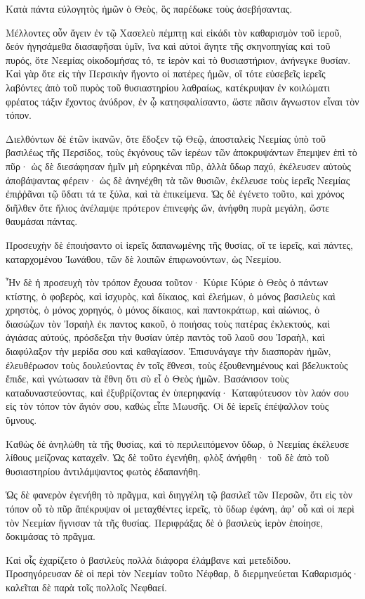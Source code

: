 {\par }{\PP {}Κατὰ πάντα εὐλογητὸς ἡμῶν ὁ Θεὸς, ὃς παρέδωκε τοὺς ἀσεβήσαντας.
\par }{\PP {}Μέλλοντες οὖν ἄγειν ἐν τῷ Χασελεὺ πέμπτῃ καὶ εἰκάδι τὸν καθαρισμὸν τοῦ ἱεροῦ, δεόν ἡγησάμεθα διασαφῆσαι ὑμῖν, ἵνα καὶ αὐτοὶ ἄγητε τῆς σκηνοπηγίας καὶ τοῦ πυρός, ὅτε Νεεμίας οἰκοδομήσας τό, τε ἱερὸν καὶ τὸ θυσιαστήριον, ἀνήνεγκε θυσίαν.
Καὶ γὰρ ὅτε εἰς τὴν Περσικὴν ἤγοντο οἱ πατέρες ἡμῶν, οἵ τότε εὐσεβεῖς ἱερεῖς λαβόντες ἀπὸ τοῦ πυρὸς τοῦ θυσιαστηρίου λαθραίως, κατέκρυψαν ἐν κοιλώματι φρέατος τάξιν ἔχοντος ἀνύδρον, ἐν ᾧ κατησφαλίσαντο, ὥστε πᾶσιν ἄγνωστον εἶναι τὸν τόπον.
\par }{\PP {}Διελθόντων δὲ ἐτῶν ἱκανῶν, ὅτε ἔδοξεν τῷ Θεῷ, ἀποσταλεὶς Νεεμίας ὑπὸ τοῦ βασιλέως τῆς Περσίδος, τοὺς ἐκγόνους τῶν ἱερέων τῶν ἀποκρυψάντων ἔπεμψεν ἐπὶ τὸ πῦρ·
ὡς δὲ διεσάφησαν ἡμῖν μὴ εὑρηκέναι πῦρ, ἀλλὰ ὕδωρ παχύ, ἐκέλευσεν αὐτοὺς ἀποβάψαντας φέρειν· ὡς δὲ ἀνηνέχθη τὰ τῶν θυσιῶν, ἐκέλευσε τοὺς ἱερεῖς Νεεμίας ἐπιῤῥᾶναι τῷ ὕδατι τά τε ξύλα, καὶ τὰ ἐπικείμενα.
Ὡς δὲ ἐγένετο τοῦτο, καὶ χρόνος διῆλθεν ὅτε ἥλιος ἀνέλαμψε πρότερον ἐπινεφὴς ὤν, ἀνήφθη πυρὰ μεγάλη, ὥστε θαυμάσαι πάντας.
\par }{\PP {}Προσευχὴν δὲ ἐποιήσαντο οἱ ἱερεῖς δαπανωμένης τῆς θυσίας, οἵ τε ἱερεῖς, καὶ πάντες, καταρχομένου Ἰωνάθου, τῶν δὲ λοιπῶν ἐπιφωνούντων, ὡς Νεεμίου.
\par }{\PP {}Ἦν δὲ ἡ προσευχὴ τὸν τρόπον ἔχουσα τοῦτον· Κύριε Κύριε ὁ Θεὸς ὁ πάντων κτίστης, ὁ φοβερὸς, καὶ ἰσχυρὸς, καὶ δίκαιος, καὶ ἐλεήμων, ὁ μόνος βασιλεὺς καὶ χρηστὸς,
ὁ μόνος χορηγός, ὁ μόνος δίκαιος, καὶ παντοκράτωρ, καὶ αἰώνιος, ὁ διασώζων τὸν Ἰσραὴλ ἐκ παντος κακοῦ, ὁ ποιήσας τοὺς πατέρας ἐκλεκτούς, καὶ ἁγιάσας αὐτούς,
πρόσδεξαι τὴν θυσίαν ὑπὲρ παντὸς τοῦ λαοῦ σου Ἰσραὴλ, καὶ διαφύλαξον τὴν μερίδα σου καὶ καθαγίασον.
Ἐπισυνάγαγε τὴν διασπορὰν ἡμῶν, ἐλευθέρωσον τοὺς δουλεύοντας ἐν τοῖς ἔθνεσι, τοὺς ἐξουθενημένους καὶ βδελυκτοὺς ἔπιδε, καὶ γνώτωσαν τὰ ἔθνη ὅτι σὺ εἶ ὁ Θεὸς ἡμῶν.
Βασάνισον τοὺς καταδυναστεύοντας, καὶ ἐξυβρίζοντας ἐν ὑπερηφανίᾳ·
Καταφύτευσον τὸν λαόν σου εἰς τὸν τόπον τὸν ἅγιόν σου, καθὼς εἶπε Μωυσῆς.
Οἱ δὲ ἱερεῖς ἐπέψαλλον τοὺς ὕμνους.
\par }{\PP {}Καθὼς δὲ ἀνηλώθη τὰ τῆς θυσίας, καὶ τὸ περιλειπόμενον ὕδωρ, ὁ Νεεμίας ἐκέλευσε λίθους μείζονας καταχεῖν.
Ὡς δὲ τοῦτο ἐγενήθη, φλὸξ ἀνήφθη· τοῦ δὲ ἀπὸ τοῦ θυσιαστηρίου ἀντιλάμψαντος φωτὸς ἐδαπανήθη.
\par }{\PP {}Ὡς δὲ φανερὸν ἐγενήθη τὸ πρᾶγμα, καὶ διηγγέλη τῷ βασιλεῖ τῶν Περσῶν, ὅτι εἰς τὸν τόπον οὗ τὸ πῦρ ἄπέκρυψαν οἱ μεταχθέντες ἱερεῖς, τὸ ὕδωρ ἐφάνη, ἀφʼ οὗ καὶ οἱ περὶ τὸν Νεεμίαν ἥγνισαν τὰ τῆς θυσίας.
Περιφράξας δὲ ὁ βασιλεὺς ἱερὸν ἐποίησε, δοκιμάσας τὸ πρᾶγμα.
\par }{\PP {}Καὶ οἷς ἐχαρίζετο ὁ βασιλεὺς πολλὰ διάφορα ἐλάμβανε καὶ μετεδίδου.
Προσηγόρευσαν δὲ οἱ περὶ τὸν Νεεμίαν τοῦτο Νέφθαρ, ὃ διερμηνεύεται Καθαρισμός· καλεῖται δὲ παρὰ τοῖς πολλοῖς Νεφθαεί.

}
